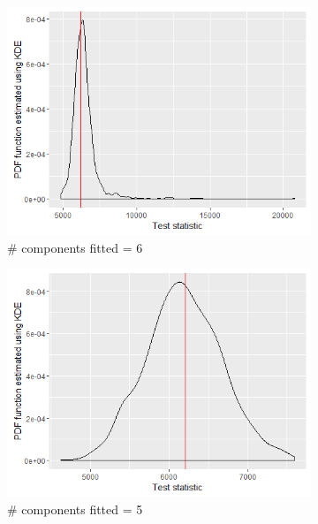 \begin{figure}[!htb]
\begin{subfigure}[b]{0.4\textwidth}
		\includegraphics[width=\textwidth]{mainmatter/chapter_5_simulation_study/ppc_5wellsep6comp.png}
          \caption{\label{fig : ppc_5wellsep6comp}\# components fitted = 6}
	\end{subfigure}
	\begin{subfigure}[b]{0.4\textwidth}
		\includegraphics[width=\textwidth]{mainmatter/chapter_5_simulation_study/ppc_5wellsep5comp.png}
          \caption{\label{fig : ppc_5wellsep5comp}\# components fitted = 5}
	\end{subfigure}
	\begin{subfigure}[b]{0.4\textwidth}

\end{subfigure}
\end{figure}
